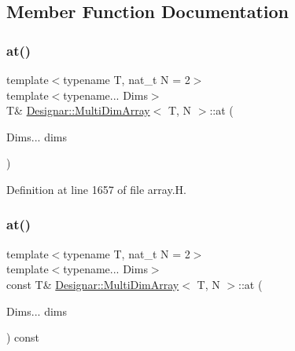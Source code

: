 \subsection{Member Function Documentation}
\mbox{\label{class_designar_1_1_multi_dim_array_a35f5b6b915a03e4ba04ccd28af40dc79}} 
\subsubsection{\texorpdfstring{at()}{at()}\hspace{0.1cm}{\footnotesize\ttfamily [1/2]}}
{\footnotesize\ttfamily template$<$typename T, nat\+\_\+t N = 2$>$ \\
template$<$typename... Dims$>$ \\
T\& \hyperlink{class_designar_1_1_multi_dim_array}{Designar\+::\+Multi\+Dim\+Array}$<$ T, N $>$\+::at (\begin{DoxyParamCaption}\item[{Dims...}]{dims }\end{DoxyParamCaption})\hspace{0.3cm}{\ttfamily [inline]}}



Definition at line 1657 of file array.\+H.

\mbox{\label{class_designar_1_1_multi_dim_array_aa6c5641e0839fae2bc8d1dadc134cc71}} 
\subsubsection{\texorpdfstring{at()}{at()}\hspace{0.1cm}{\footnotesize\ttfamily [2/2]}}
{\footnotesize\ttfamily template$<$typename T, nat\+\_\+t N = 2$>$ \\
template$<$typename... Dims$>$ \\
const T\& \hyperlink{class_designar_1_1_multi_dim_array}{Designar\+::\+Multi\+Dim\+Array}$<$ T, N $>$\+::at (\begin{DoxyParamCaption}\item[{Dims...}]{dims }\end{DoxyParamCaption}) const\hspace{0.3cm}{\ttfamily [inline]}}



